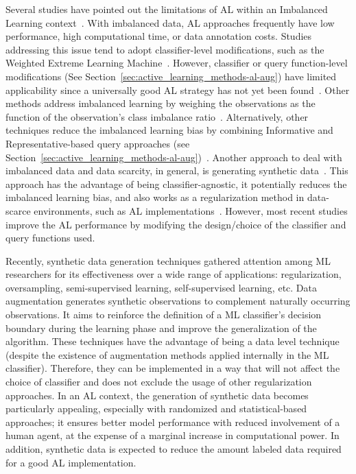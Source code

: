 Several studies have pointed out the limitations of AL within an Imbalanced
Learning context~\cite{Yu2019, zhang2020reinforcement}. With imbalanced data,
AL approaches frequently have low performance, high computational time, or
data annotation costs.  Studies addressing this issue tend to adopt
classifier-level modifications, such as the Weighted Extreme Learning
Machine~\cite{Yu2019, Zong2013, Qin2021}. However, classifier or query
function-level modifications (See Section~\ref{sec:active_learning_methods-al-aug})
have limited applicability since a universally good AL strategy has not yet
been found~\cite{Sener2018}. Other methods address imbalanced learning by
weighing the observations as the function of the observation's class imbalance
ratio~\cite{Liu2021}. Alternatively, other techniques reduce the imbalanced
learning bias by combining Informative and Representative-based query
approaches (see Section~\ref{sec:active_learning_methods-al-aug})~\cite{Tharwat2020}.
Another approach to deal with imbalanced data and data scarcity, in general,
is generating synthetic data~\cite{He2009}. This approach has the
advantage of being classifier-agnostic, it potentially reduces the imbalanced
learning bias, and also works as a regularization method in data-scarce
environments, such as AL implementations~\cite{Kim2021}. However, most recent
studies improve the AL performance by modifying the design/choice of the
classifier and query functions used.

Recently, synthetic data generation techniques gathered attention among ML
researchers for its effectiveness over a wide range of applications:
regularization, oversampling, semi-supervised learning, self-supervised
learning, etc. Data augmentation generates synthetic observations to
complement naturally occurring observations. It aims to reinforce the
definition of a ML classifier's decision boundary during the learning phase
and improve the generalization of the algorithm. These techniques have the
advantage of being a data level technique (despite the existence of
augmentation methods applied internally in the ML classifier). Therefore, they
can be implemented in a way that will not affect the choice of classifier and
does not exclude the usage of other regularization approaches. In an AL
context, the generation of synthetic data becomes particularly appealing,
especially with randomized and statistical-based approaches; it ensures better
model performance with reduced involvement of a human agent, at the expense of
a marginal increase in computational power. In addition, synthetic data is
expected to reduce the amount labeled data required for a good AL
implementation.

